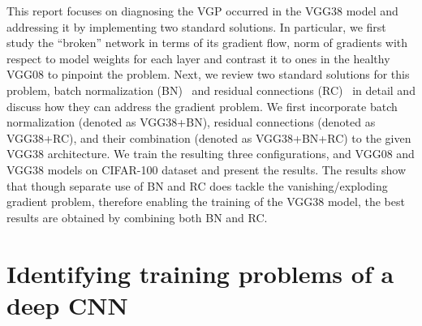 \documentclass{article}
\begin{document}
This report focuses on diagnosing the VGP occurred in the VGG38 model and addressing
it by implementing two standard solutions.
In particular, we first study the ``broken''
network in terms of its gradient flow, norm of gradients with respect to
model weights for each layer and contrast it 
to ones in the healthy VGG08 to pinpoint the problem.
Next, we review two standard solutions for this problem, 
batch normalization (BN)~\cite{ioffe2015batch} and residual connections (RC)~\cite{he2016deep}
in detail and discuss how they can address the gradient problem.
We first incorporate batch normalization (denoted as VGG38+BN), 
residual connections (denoted as VGG38+RC), 
and their combination (denoted as VGG38+BN+RC) to the given VGG38 architecture.
We train the resulting three configurations, and VGG08 and VGG38 models on 
CIFAR-100 dataset and present the results.
The results show that though separate use of BN and RC does tackle 
the vanishing/exploding gradient problem, therefore enabling the training of the VGG38 model, 
the best results are obtained by combining both BN and RC.

%


\section{Identifying training problems of a deep CNN}
\label{sec:task1}
\end{document}
